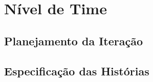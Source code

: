 \chapter[Nível de Time]{Nível de Time}

\section{Planejamento da Iteração}

\section{Especificação das Histórias}